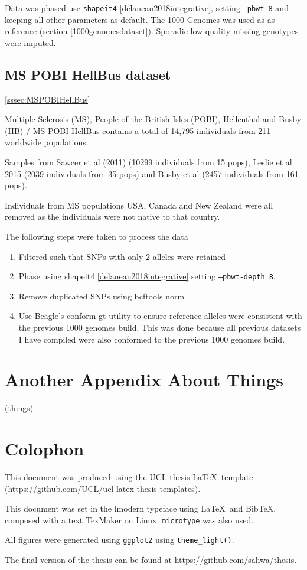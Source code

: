 Data was phased use \texttt{shapeit4} \ref{delaneau2018integrative}, setting \texttt{--pbwt 8} and keeping all other parameters as default. The 1000 Genomes was used as as reference (section \ref{1000genomesdataset}). Sporadic low quality missing genotypes were imputed. 



\section{MS POBI HellBus dataset}
\ref{sssec:MSPOBIHellBus}


Multiple Sclerosis (MS), People of the British Isles (POBI), Hellenthal and Busby (HB) / MS POBI HellBus contains a total of 14,795 individuals from 211 worldwide populations. 

Samples from Sawcer et al (2011) \cite{Sawcer2011} (10299 individuals from 15 pops), Leslie et al 2015 \cite{Leslie2015} (2039 individuals from 35 pops) and Busby et al (2457 individuals from  161 pops). 

Individuals from MS populations USA, Canada and New Zealand were all removed as the individuals were not native to that country.

The following steps were taken to process the data

\begin{enumerate}
\item Filtered such that SNPs with only 2 alleles were retained
\item Phase using shapeit4 \ref{delaneau2018integrative} setting \texttt{--pbwt-depth 8}.
\item Remove duplicated SNPs using bcftools norm \cite{li2009sequence} 
\item Use Beagle's conform-gt utility to ensure reference alleles were consistent with the previous 1000 genomes build. This was done because all previous datasets I have compiled were also conformed to the previous 1000 genomes build. 
\end{enumerate}

\chapter{Another Appendix About Things}
\label{appendixlabel2}
(things)

\chapter{Colophon}
\label{appendixlabel3}

This document was produced using the UCL thesis \LaTeX\ template (\url{https://github.com/UCL/ucl-latex-thesis-templates}).

This document was set in the lmodern typeface using \LaTeX\ and Bib\TeX, composed with a text TexMaker on Linux. \texttt{microtype} was also used.

All figures were generated using \texttt{ggplot2} using \texttt{theme\_light()}.

The final version of the thesis can be found at \url{https://github.com/sahwa/thesis}.